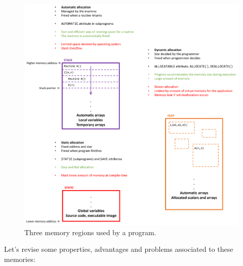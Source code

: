 \begin{figure}[h]
    \centering
    \includegraphics[width= \textwidth]{./doc/Figures/Memories.png}
    \caption{Three memory regions used by a program.}
    \label{fig:Memories}
\end{figure}

Let's revise some properties, advantages and problems associated to these memories:

